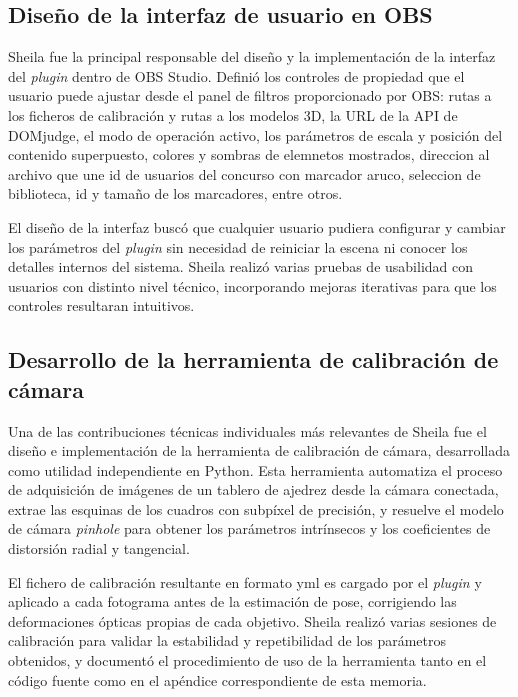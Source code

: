 \subsection*{Diseño de la interfaz de usuario en OBS}

Sheila fue la principal responsable del diseño y la implementación de la interfaz del \textit{plugin} dentro de OBS Studio. Definió los controles de propiedad que el usuario puede ajustar desde el panel de filtros proporcionado por OBS: rutas a los ficheros de calibración y rutas a los modelos 3D, la URL de la API de DOMjudge, el modo de operación activo, los parámetros de escala y posición del contenido superpuesto, colores y sombras de elemnetos mostrados, direccion al archivo que une id de usuarios del concurso con marcador aruco, seleccion de biblioteca, id y tamaño de los marcadores, entre otros.

El diseño de la interfaz buscó que cualquier usuario pudiera configurar y cambiar los parámetros del \textit{plugin} sin necesidad de reiniciar la escena ni conocer los detalles internos del sistema. Sheila realizó varias pruebas de usabilidad con usuarios con distinto nivel técnico, incorporando mejoras iterativas para que los controles resultaran intuitivos.

\subsection*{Desarrollo de la herramienta de calibración de cámara}

Una de las contribuciones técnicas individuales más relevantes de Sheila fue el diseño e implementación de la herramienta de calibración de cámara, desarrollada como utilidad independiente en Python. Esta herramienta automatiza el proceso de adquisición de imágenes de un tablero de ajedrez desde la cámara conectada, extrae las esquinas de los cuadros con subpíxel de precisión, y resuelve el modelo de cámara \textit{pinhole} para obtener los parámetros intrínsecos y los coeficientes de distorsión radial y tangencial.

El fichero de calibración resultante en formato yml es cargado por el \textit{plugin} y aplicado a cada fotograma antes de la estimación de pose, corrigiendo las deformaciones ópticas propias de cada objetivo. Sheila realizó varias sesiones de calibración para validar la estabilidad y repetibilidad de los parámetros obtenidos, y documentó el procedimiento de uso de la herramienta tanto en el código fuente como en el apéndice correspondiente de esta memoria.

